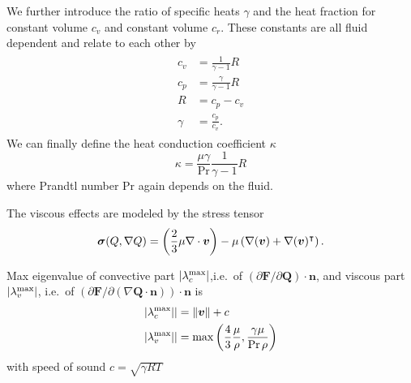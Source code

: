 We further introduce the ratio of specific heats $\gamma$ and the heat fraction for constant volume $c_v$ and constant volume $c_r$.
These constants are all fluid dependent and relate to each other by
\begin{align}
  \label{eq:fluid-constants}
  \begin{split}
  c_v &= \frac{1}{\gamma - 1} R \\
  c_p &= \frac{\gamma}{\gamma - 1} R\\
  R &= c_p - c_v\\
  \gamma &= \frac{c_p}{c_v}.
  \end{split}
\end{align}
We can finally define the heat conduction coefficient $\kappa$
\begin{equation}
  \label{eq:heat-conduction-coeff}
  \kappa = \frac{\mu \gamma}{\Pr} \frac{1}{\gamma - 1} R
\end{equation}
where Prandtl number $\text{Pr}$ again depends on the fluid.


The viscous effects are modeled by the stress tensor
\begin{equation}
  \label{eq:stress-tensor}
  \bm{\sigma}(Q, \nabla Q) = \left(\frac{2}{3} \mu \nabla \cdot \bm{v} \right) -
  \mu \left( \nabla (\bm{v}) + \nabla ( \bm{v} )^\intercal \right).
\end{equation}

Max eigenvalue of convective part $\maxConvEigen$,i.e.\ of $\left( \partial \bm{F}/\partial \bm{Q}\right) \cdot \bm{n}$,
and viscous part $\maxViscEigen$, i.e.\ of $\left( \partial \bm{F}/\partial \left( \nabla \bm{Q} \cdot \bm{n} \right)\right) \cdot \bm{n}$
is
\begin{align}
  \maxConvEigen \vert  &= \Vert \Qv \Vert + c\\
  \maxViscEigen \vert &= \max \left( \frac{4}{3} \frac{\mu}{\Qrho}
                                       , \frac{\gamma \mu}{\Pr \Qrho} \right)
\end{align}
with speed of sound $c = \sqrt{\gamma R T }$

